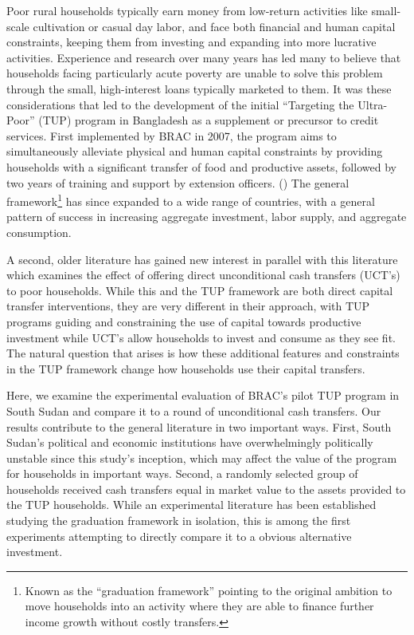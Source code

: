 \documentclass[12pt,article]{article}
\begin{document}
Poor rural households typically earn money from low-return activities like
small-scale cultivation or casual day labor, and face both financial and human
capital constraints, keeping them from investing and expanding into more lucrative
activities. Experience and research over many years has led many to believe that
households facing particularly acute poverty are unable to solve this problem through
the small, high-interest loans typically marketed to them. It was these
considerations that led to the development of the initial ``Targeting the
Ultra-Poor'' (TUP) program in Bangladesh as a supplement or precursor to credit
services. First implemented by BRAC in 2007, the program aims to simultaneously
alleviate physical and human capital constraints by providing households with a
significant transfer of food and productive assets, followed by two years of training
and support by extension officers. (\cite{bandiera2017}) The general framework\footnote{Known as the
``graduation framework'' pointing to the original ambition to move households into an
activity where they are able to finance further income growth without costly
transfers.} has since expanded to a wide range of countries, with a general pattern
of success in increasing aggregate investment, labor supply, and aggregate
consumption. \citep{banerjee2015}

A second, older literature has gained new interest in parallel with this
literature which examines the effect of offering direct unconditional cash transfers
(UCT's) to poor households. \citep{haushofer-shapiro2013} \citep{blattman2014} \citep{blattman2013}
While this and the TUP framework are both direct capital transfer
interventions, they are very different in their approach, with TUP programs guiding
and constraining the use of capital towards productive investment while UCT's allow
households to invest and consume as they see fit. The natural question that arises is
how these additional features and constraints in the TUP framework change how
households use their capital transfers.

Here, we examine the experimental evaluation of BRAC's pilot TUP program in South
Sudan and compare it to a round of unconditional cash transfers. Our results
contribute to the general literature in two important ways. First, South Sudan's
political and economic institutions have overwhelmingly politically unstable since
this study's inception, which may affect the value of the program for
households in important ways. Second, a randomly selected group of households
received cash transfers equal in market value to the assets provided to the TUP
households. While an experimental literature has been established studying the
graduation framework in isolation, this is among the first experiments attempting to
directly compare it to a obvious alternative investment.
\end{document}
